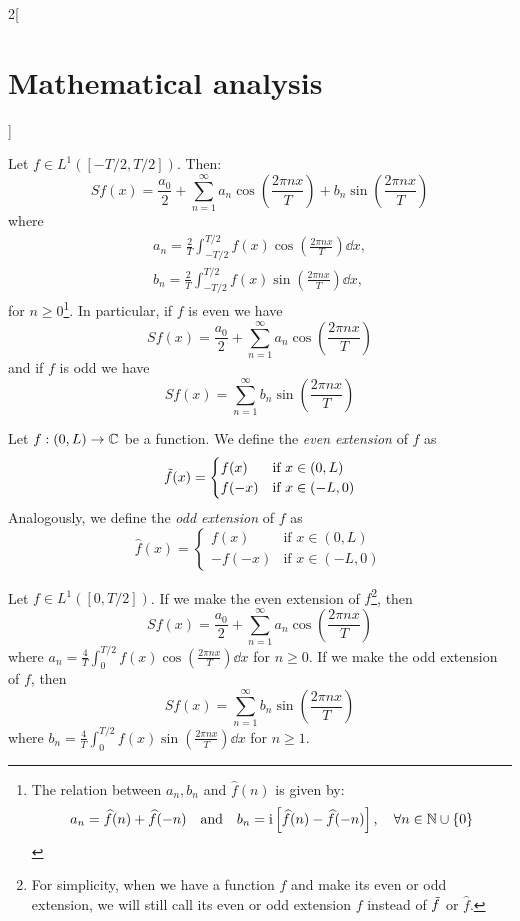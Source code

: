 \documentclass[../../../main.tex]{subfiles}
\begin{document}
\begin{multicols}{2}[\section{Mathematical analysis}]
\begin{definition}
  \end{definition}
  \begin{proposition}
    Let $f\in L^1([-T/2,T/2])$. Then: $$Sf(x)=\frac{a_0}{2}+\sum_{n=1}^\infty a_n\cos\left(\frac{2\pi nx}{T}\right)+b_n\sin\left(\frac{2\pi nx}{T}\right)$$ where \begin{gather*}
      a_n=\frac{2}{T}\int_{-T/2}^{T/2}f(x)\cos\left(\frac{2\pi nx}{T}\right)\dd{x},\\ b_n=\frac{2}{T}\int_{-T/2}^{T/2}f(x)\sin\left(\frac{2\pi nx}{T}\right)\dd{x},
    \end{gather*} for $n\geq 0$\footnote{The relation between $a_n,b_n$ and $\widehat{f}(n)$ is given by: $$a_n=\widehat{f}(n)+\widehat{f}(-n)\quad\text{and}\quad b_n=\mathrm{i}\left[\widehat{f}(n)-\widehat{f}(-n)\right],\quad\forall n\in\mathbb{N} \cup\{0\}$$}. In particular, if $f$ is even we have $$Sf(x)=\frac{a_0}{2}+\sum_{n=1}^\infty a_n\cos\left(\frac{2\pi nx}{T}\right)$$ and if $f$ is odd we have $$Sf(x)=\sum_{n=1}^\infty b_n\sin\left(\frac{2\pi nx}{T}\right)$$
  \end{proposition}
  \begin{definition}
    Let $f:(0,L)\rightarrow\mathbb{C} $ be a function. We define the \emph{even extension} of $f$ as $$\Tilde{f}(x)=
      \begin{cases}
        f(x)  & \text{if }x\in(0,L)  \\
        f(-x) & \text{if }x\in(-L,0)
      \end{cases}$$ Analogously, we define the \emph{odd extension} of $f$ as $$\hat{f}(x)=
      \begin{cases}
        f(x)   & \text{if }x\in(0,L)  \\
        -f(-x) & \text{if }x\in(-L,0)
      \end{cases}$$
  \end{definition}
  \begin{proposition}
    Let $f\in L^1([0,T/2])$. If we make the even extension of $f$\footnote{For simplicity, when we have a function $f$ and make its even or odd extension, we will still call its even or odd extension $f$ instead of $\Tilde{f}$ or $\hat{f}$.}, then $$Sf(x)=\frac{a_0}{2}+\sum_{n=1}^\infty a_n\cos\left(\frac{2\pi nx}{T}\right)$$ where $\displaystyle a_n=\frac{4}{T}\int_0^{T/2}f(x)\cos\left(\frac{2\pi nx}{T}\right)\dd{x}$ for $n\geq 0$. If we make the odd extension of $f$, then $$Sf(x)=\sum_{n=1}^\infty b_n\sin\left(\frac{2\pi nx}{T}\right)$$ where $\displaystyle b_n=\frac{4}{T}\int_0^{T/2}f(x)\sin\left(\frac{2\pi nx}{T}\right)\dd{x}$ for $n\geq 1$.
  \end{proposition}

\end{multicols}
\end{document}

